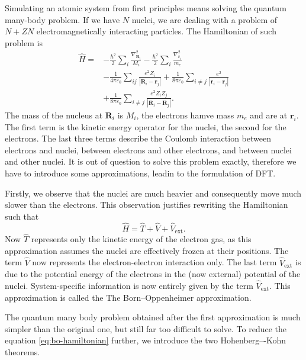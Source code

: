 Simulating an atomic system from first principles means solving the quantum
many-body problem. If we have $N$ nuclei, we are dealing with a problem of
$N + ZN$ electromagnetically interacting particles. The Hamiltonian of such
problem is
\begin{equation}
\begin{alignedat}{2}
  \hat H = & - \frac{\hbar^2}{2} \sum_i \frac{\nabla^2_{\mathbf{R}_i}}{M_i}
  - \frac{\hbar^2}{2} \sum_i \frac{\nabla^2_{\mathbf{r}_i}}{m_e} \\
  & - \frac{1}{4 \pi \varepsilon_0} \sum_{ij} \frac{e^2 Z_i}{|\mathbf{R}_i - \mathbf{r}_j|}
  + \frac{1}{8 \pi \varepsilon_0} \sum_{i\neq j} \frac{e^2}{|\mathbf{r}_i - \mathbf{r}_j|} \\
  & + \frac{1}{8 \pi \varepsilon_0} \sum_{i \neq j} \frac{e^2 Z_i Z_j}{|\mathbf{R}_i - \mathbf{R}_j|}.
\end{alignedat}
\end{equation}
The mass of the nucleus at $\mathbf{R}_i$ is $M_i$, the electrons hamve mass
$m_e$ and are at $\mathbf{r}_i$. The first term is the kinetic energy operator
for the nuclei, the second for the electrons. The last three terms describe
the Coulomb interaction between electrons and nuclei, between electrons and
other electrons, and between nuclei and other nuclei. It is out of question
to solve this problem exactly, therefore we have to introduce some
approximations, leadin to the formulation of DFT.

Firstly, we observe that the nuclei are much heavier and consequently move
much slower than the electrons. This observation justifies rewriting the
Hamiltonian such that
\begin{equation}
  \label{eq:bo-hamiltonian}
  \hat H = \hat T + \hat V + \hat V_\mathrm{ext}.
\end{equation}
Now $\hat T$ represents only the kinetic energy of the electron gas, as this
approximation assumes the nuclei are effectively frozen at their positions.
The term $\hat V$ now represents the electron-electron interaction only. The
last term $\hat V_\mathrm{ext}$ is due to the potential energy of the
electrons in the (now external) potential of the nuclei. System-specific
information is now entirely given by the term $\hat V_\mathrm{ext}$. This
approximation is called the The Born--Oppenheimer approximation.

The quantum many body problem obtained after the first approximation is much
simpler than the original one, but still far too difficult to solve. To reduce
the equation \eqref{eq:bo-hamiltonian} further, we introduce the two
Hohenberg–-Kohn theorems.

